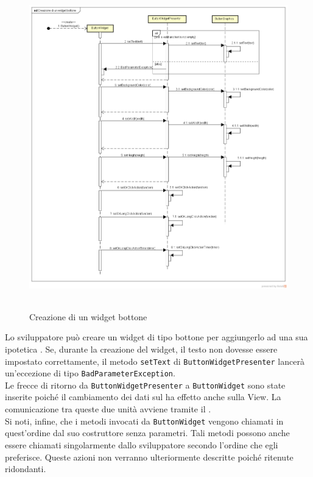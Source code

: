 \label{Creazione di un widget bottone}
\begin{figure}[H]
	\centering
	\includegraphics[width=16cm, height=14cm]{Sezioni/Diagrammi/img/Creazione di un widget bottone.png}
	\caption{Creazione di un widget bottone}
\end{figure}

Lo sviluppatore può creare un widget di tipo bottone per aggiungerlo ad una sua ipotetica . Se, durante la creazione del widget, il testo non dovesse essere impostato correttamente, il metodo \texttt{setText} di \texttt{ButtonWidgetPresenter} lancerà un'eccezione di tipo \texttt{BadParameterException}. \\
Le frecce di ritorno da \texttt{ButtonWidgetPresenter}  a \texttt{ButtonWidget} sono state inserite poiché il cambiamento dei dati sul  ha effetto anche sulla View. La comunicazione tra queste due unità avviene tramite il  . \\
Si noti, infine, che i metodi invocati da \texttt{ButtonWidget} vengono chiamati in quest'ordine dal suo costruttore senza parametri. Tali metodi possono anche essere chiamati singolarmente dallo sviluppatore secondo l'ordine che egli preferisce. Queste azioni non verranno ulteriormente descritte poiché ritenute ridondanti.

